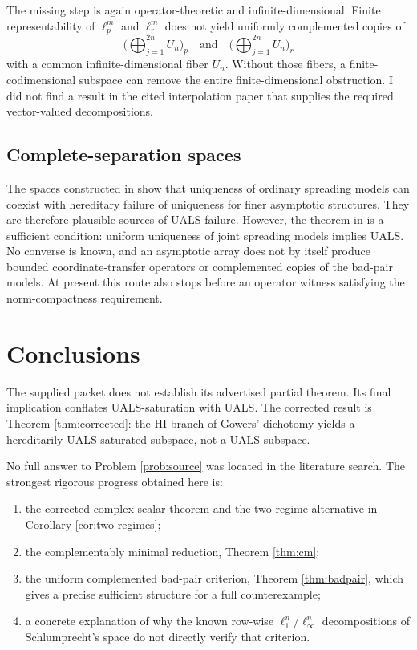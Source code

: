 \documentclass[11pt]{article}
\theoremstyle{definition}
\theoremstyle{remark}
\begin{document}
The missing step is again operator-theoretic and infinite-dimensional.  Finite representability of $\ell_p^m$ and $\ell_r^m$ does not yield uniformly complemented copies of
\[
  \Big(\bigoplus_{j=1}^{2n}U_n\Big)_p
  \quad\text{and}\quad
  \Big(\bigoplus_{j=1}^{2n}U_n\Big)_r
\]
with a common infinite-dimensional fiber $U_n$.  Without those fibers, a finite-codimensional subspace can remove the entire finite-dimensional obstruction.  I did not find a result in the cited interpolation paper that supplies the required vector-valued decompositions.

\subsection{Complete-separation spaces}

The spaces constructed in \cite{AM,AGM,GMS} show that uniqueness of ordinary spreading models can coexist with hereditary failure of uniqueness for finer asymptotic structures.  They are therefore plausible sources of UALS failure.  However, the theorem in \cite{AGLM} is a sufficient condition: uniform uniqueness of joint spreading models implies UALS.  No converse is known, and an asymptotic array does not by itself produce bounded coordinate-transfer operators or complemented copies of the bad-pair models.  At present this route also stops before an operator witness satisfying the norm-compactness requirement.

\section{Conclusions}

The supplied packet does not establish its advertised partial theorem.  Its final implication conflates UALS-saturation with UALS.  The corrected result is Theorem \ref{thm:corrected}: the HI branch of Gowers' dichotomy yields a hereditarily UALS-saturated subspace, not a UALS subspace.

No full answer to Problem \ref{prob:source} was located in the literature search.  The strongest rigorous progress obtained here is:
\begin{enumerate}[label=(\arabic*),leftmargin=2.2em]
\item the corrected complex-scalar theorem and the two-regime alternative in Corollary \ref{cor:two-regimes};
\item the complementably minimal reduction, Theorem \ref{thm:cm};
\item the uniform complemented bad-pair criterion, Theorem \ref{thm:badpair}, which gives a precise sufficient structure for a full counterexample;
\item a concrete explanation of why the known row-wise $\ell_1^n/\ell_\infty^n$ decompositions of Schlumprecht's space do not directly verify that criterion.
\end{enumerate}
\end{document}
